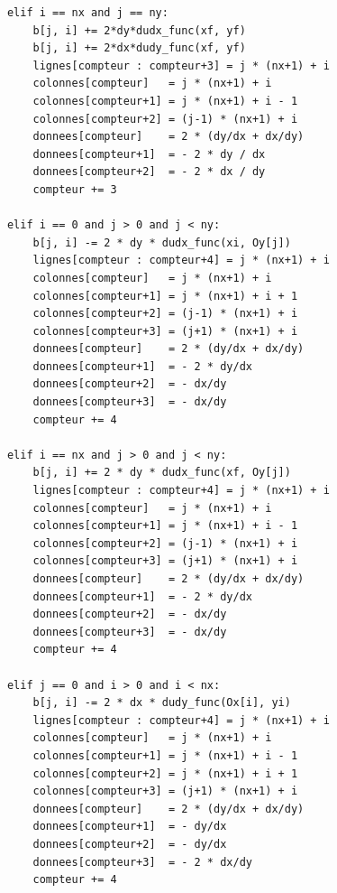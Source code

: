 \begin{verbatim}
            elif i == nx and j == ny:
                b[j, i] += 2*dy*dudx_func(xf, yf)
                b[j, i] += 2*dx*dudy_func(xf, yf)
                lignes[compteur : compteur+3] = j * (nx+1) + i
                colonnes[compteur]   = j * (nx+1) + i
                colonnes[compteur+1] = j * (nx+1) + i - 1
                colonnes[compteur+2] = (j-1) * (nx+1) + i
                donnees[compteur]    = 2 * (dy/dx + dx/dy)
                donnees[compteur+1]  = - 2 * dy / dx
                donnees[compteur+2]  = - 2 * dx / dy
                compteur += 3
            
            elif i == 0 and j > 0 and j < ny:
                b[j, i] -= 2 * dy * dudx_func(xi, Oy[j])
                lignes[compteur : compteur+4] = j * (nx+1) + i
                colonnes[compteur]   = j * (nx+1) + i
                colonnes[compteur+1] = j * (nx+1) + i + 1
                colonnes[compteur+2] = (j-1) * (nx+1) + i
                colonnes[compteur+3] = (j+1) * (nx+1) + i
                donnees[compteur]    = 2 * (dy/dx + dx/dy)
                donnees[compteur+1]  = - 2 * dy/dx
                donnees[compteur+2]  = - dx/dy
                donnees[compteur+3]  = - dx/dy
                compteur += 4

            elif i == nx and j > 0 and j < ny:
                b[j, i] += 2 * dy * dudx_func(xf, Oy[j])
                lignes[compteur : compteur+4] = j * (nx+1) + i
                colonnes[compteur]   = j * (nx+1) + i
                colonnes[compteur+1] = j * (nx+1) + i - 1
                colonnes[compteur+2] = (j-1) * (nx+1) + i
                colonnes[compteur+3] = (j+1) * (nx+1) + i
                donnees[compteur]    = 2 * (dy/dx + dx/dy)
                donnees[compteur+1]  = - 2 * dy/dx
                donnees[compteur+2]  = - dx/dy
                donnees[compteur+3]  = - dx/dy
                compteur += 4

            elif j == 0 and i > 0 and i < nx:
                b[j, i] -= 2 * dx * dudy_func(Ox[i], yi)
                lignes[compteur : compteur+4] = j * (nx+1) + i
                colonnes[compteur]   = j * (nx+1) + i
                colonnes[compteur+1] = j * (nx+1) + i - 1
                colonnes[compteur+2] = j * (nx+1) + i + 1
                colonnes[compteur+3] = (j+1) * (nx+1) + i
                donnees[compteur]    = 2 * (dy/dx + dx/dy)
                donnees[compteur+1]  = - dy/dx
                donnees[compteur+2]  = - dy/dx
                donnees[compteur+3]  = - 2 * dx/dy
                compteur += 4


\end{verbatim}
